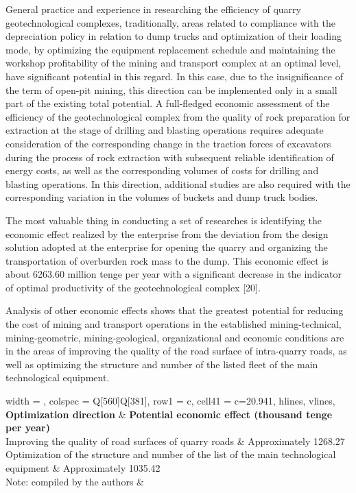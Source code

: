\begin{multicols}{2}
General practice and experience in researching the efficiency of quarry
geotechnological complexes, traditionally, areas related to compliance
with the depreciation policy in relation to dump trucks and optimization
of their loading mode, by optimizing the equipment replacement schedule
and maintaining the workshop profitability of the mining and transport
complex at an optimal level, have significant potential in this regard.
In this case, due to the insignificance of the term of open-pit mining,
this direction can be implemented only in a small part of the existing
total potential. A full-fledged economic assessment of the efficiency of
the geotechnological complex from the quality of rock preparation for
extraction at the stage of drilling and blasting operations requires
adequate consideration of the corresponding change in the traction
forces of excavators during the process of rock extraction with
subsequent reliable identification of energy costs, as well as the
corresponding volumes of costs for drilling and blasting operations. In
this direction, additional studies are also required with the
corresponding variation in the volumes of buckets and dump truck bodies.

The most valuable thing in conducting a set of researches is identifying
the economic effect realized by the enterprise from the deviation from
the design solution adopted at the enterprise for opening the quarry and
organizing the transportation of overburden rock mass to the dump. This
economic effect is about 6263.60 million tenge per year with a
significant decrease in the indicator of optimal productivity of the
geotechnological complex {[}20{]}.

Analysis of other economic effects shows that the greatest potential for
reducing the cost of mining and transport operations in the established
mining-technical, mining-geometric, mining-geological, organizational
and economic conditions are in the areas of improving the quality of the
road surface of intra-quarry roads, as well as optimizing the structure
and number of the listed fleet of the main technological equipment.
\end{multicols}

\begin{longtblr}[
  caption = {\bfseries Table 2 - Potential economic effect, thousand tenge per year},
  label = none,
  entry = none,
]{
  width = \linewidth,
  colspec = {Q[560]Q[381]},
  row{1} = {c},
  cell{4}{1} = {c=2}{0.941\linewidth},
  hlines,
  vlines,
}
\textbf{Optimization			direction} & \textbf{Potential			economic effect (thousand tenge per year)}\\
Improving
			the quality of road surfaces of quarry roads & Approximately
			1268.27\\
Optimization
			of the structure and number of the list of the main technological
			equipment & Approximately
			1035.42\\
Note:
			compiled by the authors & 
\end{longtblr}

